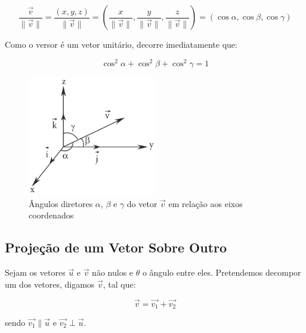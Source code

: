 \[
\frac{\vec{v}}{\|\vec{v}\|} = \frac{(x,y,z)}{\|\vec{v}\|} = \left(\frac{x}{\|\vec{v}\|}, \frac{y}{\|\vec{v}\|}, \frac{z}{\|\vec{v}\|}\right) = (\cos\alpha, \cos\beta, \cos\gamma)
\]

Como o versor é um vetor unitário, decorre imediatamente que:

\begin{equation}
  \cos^2\alpha + \cos^2\beta + \cos^2\gamma = 1
  \label{eq:relacao_cossenos_diretores}
\end{equation}

\begin{figure}[h]
  \centering
  \includegraphics[width=0.5\textwidth]{./fig/fig2.9.png}
  \caption{Ângulos diretores $\alpha$, $\beta$ e $\gamma$ do vetor $\vec{v}$ em
  relação aos eixos coordenados}
  \label{fig:fig2.9}
\end{figure}

\subsection{Projeção de um Vetor Sobre Outro}

Sejam os vetores $\vec{u}$ e $\vec{v}$ não nulos e $\theta$ o ângulo entre eles.
Pretendemos decompor um dos vetores, digamos $\vec{v}$, tal que:

\[
\vec{v} = \vec{v_1} + \vec{v_2}
\]

sendo $\vec{v_1} \parallel \vec{u}$ e $\vec{v_2} \perp \vec{u}$.

